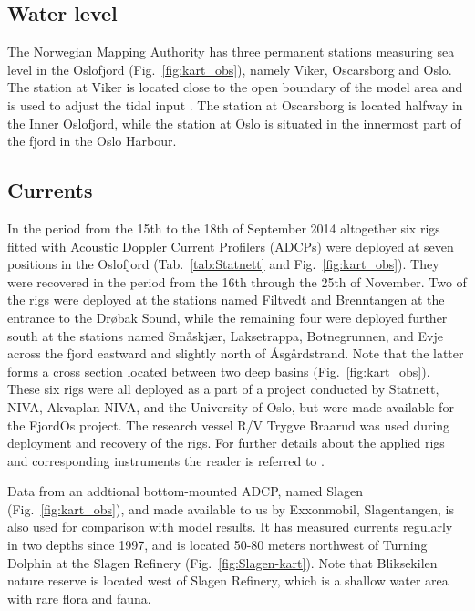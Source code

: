 \newpage

\subsection{Water level}
The Norwegian Mapping Authority has three permanent stations measuring sea level in the Oslofjord (Fig.~\ref{fig:kart_obs}), namely Viker, Oscarsborg and Oslo. The station at Viker is located close to the open boundary of the model area and is used to adjust the tidal input \cite{hjelm:etal:2017}. The station at Oscarsborg is located halfway in the Inner Oslofjord, while the station at Oslo is situated in the innermost part of the fjord in the Oslo Harbour.

\subsection{Currents}

In the period from the 15th to the 18th of September 2014 altogether six rigs fitted with Acoustic Doppler Current Profilers (ADCPs) were deployed at seven positions in the Oslofjord (Tab.~\ref{tab:Statnett} and Fig.~\ref{fig:kart_obs}). They were recovered in the period from the 16th through the 25th of November. Two of the rigs were deployed at the stations named Filtvedt and Brenntangen at the entrance to the Dr{\o}bak Sound, while the remaining four were deployed further south at the stations named Sm{\aa}skj{\ae}r, Laksetrappa, Botnegrunnen, and Evje across the fjord eastward and slightly north of {\AA}sg{\aa}rdstrand. Note that the latter forms a cross section located between two deep basins (Fig.~\ref{fig:kart_obs}).  These six rigs were all deployed as a part of a project conducted by Statnett, NIVA, Akvaplan NIVA, and the University of Oslo, but were made available for the FjordOs project. The research vessel R/V Trygve Braarud was used during deployment and recovery of the rigs. For further details about the applied rigs and corresponding instruments the reader is referred to \cite{staalstrom:2015}.

Data from an addtional bottom-mounted ADCP, named Slagen (Fig.~\ref{fig:kart_obs}), and made available to us by Exxonmobil, Slagentangen, is also used for comparison with model results. It has measured currents regularly in two depths since 1997, and is located 50-80 meters northwest of Turning Dolphin at the Slagen Refinery (Fig.~\ref{fig:Slagen-kart}). Note that Bliksekilen nature reserve is located west of Slagen Refinery, which is a shallow water area with rare flora and fauna. 

